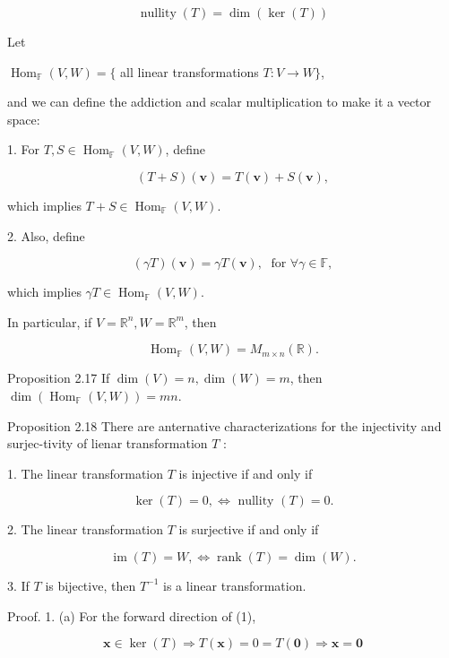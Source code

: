 \documentclass[11pt]{article}
\begin{document}
\[
\operatorname{nullity}\left( T\right)  = \dim \left( {\ker \left( T\right) }\right)
\]

Let

\({\operatorname{Hom}}_{\mathbb{F}}\left( {V,W}\right)  = \{\) all linear transformations \(T : V \rightarrow  W\}\),

and we can define the addiction and scalar multiplication to make it a vector space:

1. For \(T,S \in  {\operatorname{Hom}}_{\mathbb{F}}\left( {V,W}\right)\), define

\[
\left( {T + S}\right) \left( \mathbf{v}\right)  = T\left( \mathbf{v}\right)  + S\left( \mathbf{v}\right) ,
\]

which implies \(T + S \in  {\operatorname{Hom}}_{\mathbb{F}}\left( {V,W}\right)\).

2. Also, define

\[
\left( {\gamma T}\right) \left( \mathbf{v}\right)  = {\gamma T}\left( \mathbf{v}\right) ,\;\text{ for }\forall \gamma  \in  \mathbb{F},
\]

which implies \({\gamma T} \in  {\operatorname{Hom}}_{\mathbb{F}}\left( {V,W}\right)\).

In particular, if \(V = {\mathbb{R}}^n,W = {\mathbb{R}}^{m}\), then

\[
{\operatorname{Hom}}_{\mathbb{F}}\left( {V,W}\right)  = {M}_{m \times  n}\left( \mathbb{R}\right) .
\]

Proposition 2.17 If \(\dim \left( V\right)  = n,\dim \left( W\right)  = m\), then \(\dim \left( {{\operatorname{Hom}}_{\mathbb{F}}\left( {V,W}\right) }\right)  = {mn}\).

Proposition 2.18 There are anternative characterizations for the injectivity and surjec-tivity of lienar transformation \(T\) :

1. The linear transformation \(T\) is injective if and only if

\[
\ker \left( T\right)  = 0, \Leftrightarrow  \text{ nullity }\left( T\right)  = 0.
\]

2. The linear transformation \(T\) is surjective if and only if

\[
\operatorname{im}\left( T\right)  = W, \Leftrightarrow  \operatorname{rank}\left( T\right)  = \dim \left( W\right) .
\]

3. If \(T\) is bijective, then \({T}^{-1}\) is a linear transformation.

Proof. 1. (a) For the forward direction of (1),

\[
\mathbf{x} \in  \ker \left( T\right)  \Rightarrow  T\left( \mathbf{x}\right)  = 0 = T\left( \mathbf{0}\right)  \Rightarrow  \mathbf{x} = \mathbf{0}
\]
\end{document}
